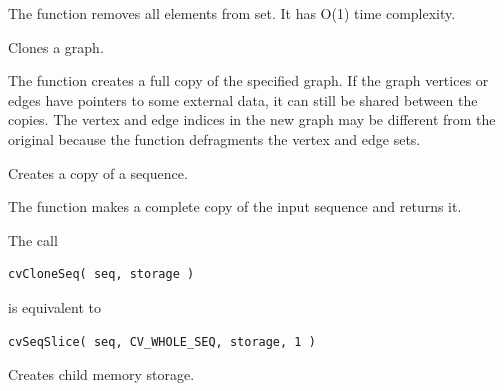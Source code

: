 \begin{description}
\end{description}


The function removes all elements from set. It has O(1) time complexity.


Clones a graph.


\begin{description}
\end{description}


The function creates a full copy of the specified graph. If the
graph vertices or edges have pointers to some external data, it can still be
shared between the copies. The vertex and edge indices in the new graph
may be different from the original because the function defragments
the vertex and edge sets.

\fi

Creates a copy of a sequence.


\begin{description}
\end{description}

The function makes a complete copy of the input sequence and returns it.

\ifC
The call
\begin{lstlisting}
cvCloneSeq( seq, storage )
\end{lstlisting}

is equivalent to

\begin{lstlisting}
cvSeqSlice( seq, CV_WHOLE_SEQ, storage, 1 )
\end{lstlisting}

Creates child memory storage.

